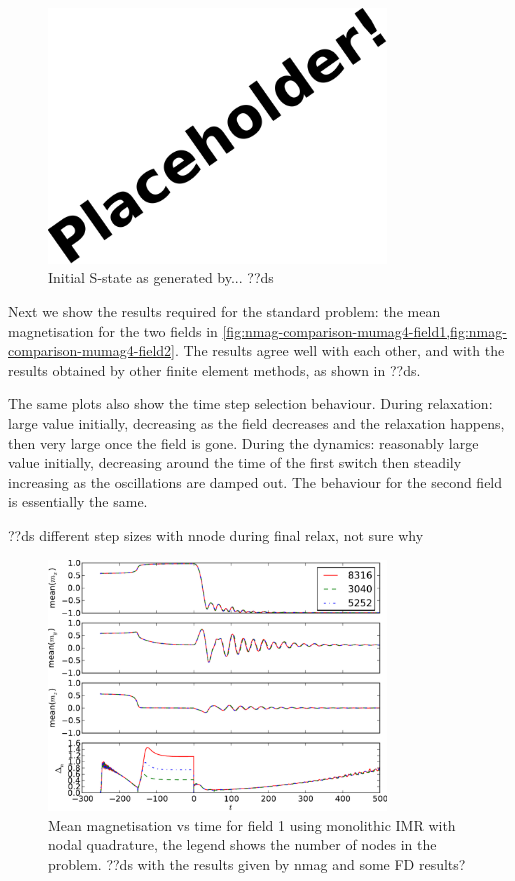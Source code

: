 \begin{figure}
  \centering
  \includegraphics[width=0.8\textwidth]{images/placeholder}
  \caption{Initial S-state as generated by... ??ds}
  \label{fig:intial-mumag4}
\end{figure}

Next we show the results required for the standard problem: the mean magnetisation for the two fields in \cref{fig:nmag-comparison-mumag4-field1,fig:nmag-comparison-mumag4-field2}.
The results agree well with each other, and with the results obtained by other finite element methods, as shown in ??ds.

The same plots also show the time step selection behaviour.
During relaxation: large value initially, decreasing as the field decreases and the relaxation happens, then very large once the field is gone.
During the dynamics: reasonably large value initially, decreasing around the time of the first switch then steadily increasing as the oscillations are damped out.
The behaviour for the second field is essentially the same.

??ds different step sizes with nnode during final relax, not sure why

\begin{figure}
  \centering
  \includegraphics[width=0.8\textwidth]{plots/mumag4_convergence/mumag4_field1-meanmxsvs-meanmysvs-meanmzsvs-dtsvstimes.pdf}
  \caption{Mean magnetisation vs time for field 1 using monolithic IMR with nodal quadrature, the legend shows the number of nodes in the problem.
    ??ds with the results given by nmag and some FD results?}
  \label{fig:nmag-comparison-mumag4-field1}
\end{figure}

